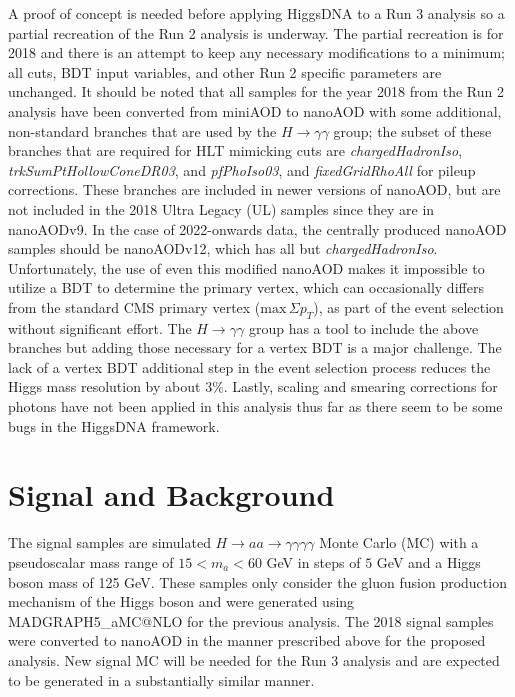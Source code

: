 \documentclass[12pt]{article}
\begin{document}
A proof of concept is needed before applying HiggsDNA to a Run 3 analysis so a partial recreation of the Run 2 analysis is underway. The partial recreation is for 2018 and there is an attempt to keep any necessary modifications to a minimum; all cuts, BDT input variables, and other Run 2 specific parameters are unchanged. It should be noted that all samples for the year 2018 from the Run 2 analysis have been converted from miniAOD to nanoAOD with some additional, non-standard branches that are used by the $H \rightarrow \gamma\gamma$ group; the subset of these branches that are required for HLT mimicking cuts are \textit{chargedHadronIso}, \textit{trkSumPtHollowConeDR03}, and \textit{pfPhoIso03}, and \textit{fixedGridRhoAll} for pileup corrections. These branches are included in newer versions of nanoAOD, but are not included in the 2018 Ultra Legacy (UL) samples since they are in nanoAODv9. In the case of 2022-onwards data, the centrally produced nanoAOD samples should be nanoAODv12, which has all but \textit{chargedHadronIso}. Unfortunately, the use of even this modified nanoAOD makes it impossible to utilize a BDT to determine the primary vertex, which can occasionally differs from the standard CMS primary vertex ($\mathrm{max}\,\Sigma p_T$), as part of the event selection without significant effort. The $H\rightarrow \gamma\gamma$ group has a tool to include the above branches but adding those necessary for a vertex BDT is a major challenge. The lack of a vertex BDT additional step in the event selection process reduces the Higgs mass resolution by about $3\%$. Lastly, scaling and smearing corrections for photons have not been applied in this analysis thus far as there seem to be some bugs in the HiggsDNA framework.\par

\section{Signal and Background}
The signal samples are simulated $H \rightarrow aa \rightarrow \gamma\gamma\gamma\gamma$ Monte Carlo (MC) with a pseudoscalar mass range of $15 < m_a < 60$ GeV in steps of $5$ GeV and a Higgs boson mass of 125 GeV. These samples only consider the gluon fusion production mechanism of the Higgs boson and were generated using MADGRAPH5\_aMC@NLO for the previous analysis. The 2018 signal samples were converted to nanoAOD in the manner prescribed above for the proposed analysis. New signal MC will be needed for the Run 3 analysis and are expected to be generated in a substantially similar manner.\par
\end{document}
